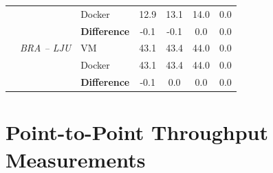 \begin{appendices}
\begin{longtable}{@{\extracolsep{\fill}}lllcccc@{}}
 & \textit{} & {\color[HTML]{333333} Docker} & 12.9 & 13.1 & 14.0 & 0.0 \\ \cmidrule(l){3-7} 
 & \textit{} & {\color[HTML]{333333} \textbf{Difference}} & {\color[HTML]{CB0000} -0.1} & {\color[HTML]{CB0000} -0.1} & 0.0 & 0.0 \\ \cmidrule(l){2-7} 
 & \textit{BRA – LJU} & {\color[HTML]{333333} VM} & 43.1 & 43.4 & 44.0 & 0.0 \\
 &  & {\color[HTML]{333333} Docker} & 43.1 & 43.4 & 44.0 & 0.0 \\ \cmidrule(l){3-7} 
 &  & {\color[HTML]{333333} \textbf{Difference}} & {\color[HTML]{CB0000} -0.1} & 0.0 & 0.0 & 0.0 \\ \bottomrule
\end{longtable}

\newpage
\section{ Point-to-Point Throughput Measurements} \label{app:PtP_through}


\end{appendices}
